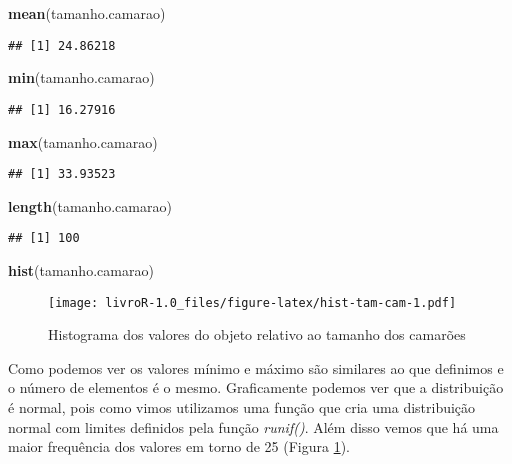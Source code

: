 \documentclass[]{book}
\newenvironment{Shaded}{\begin{snugshade}}{\end{snugshade}}
\newcommand{\KeywordTok}[1]{\textcolor[rgb]{0.13,0.29,0.53}{\textbf{#1}}}
\newcommand{\NormalTok}[1]{#1}
\begin{document}
\begin{Shaded}
\begin{Highlighting}[]
\KeywordTok{mean}\NormalTok{(tamanho.camarao)}
\end{Highlighting}
\end{Shaded}

\begin{verbatim}
## [1] 24.86218
\end{verbatim}

\begin{Shaded}
\begin{Highlighting}[]
\KeywordTok{min}\NormalTok{(tamanho.camarao)}
\end{Highlighting}
\end{Shaded}

\begin{verbatim}
## [1] 16.27916
\end{verbatim}

\begin{Shaded}
\begin{Highlighting}[]
\KeywordTok{max}\NormalTok{(tamanho.camarao)}
\end{Highlighting}
\end{Shaded}

\begin{verbatim}
## [1] 33.93523
\end{verbatim}

\begin{Shaded}
\begin{Highlighting}[]
\KeywordTok{length}\NormalTok{(tamanho.camarao)}
\end{Highlighting}
\end{Shaded}

\begin{verbatim}
## [1] 100
\end{verbatim}

\begin{Shaded}
\begin{Highlighting}[]
\KeywordTok{hist}\NormalTok{(tamanho.camarao)}
\end{Highlighting}
\end{Shaded}

\begin{figure}
\centering
\texttt{[image: livroR-1.0\_files/figure-latex/hist-tam-cam-1.pdf]}
\caption{\label{fig:hist-tam-cam}Histograma dos valores do objeto relativo ao tamanho dos camarões}
\end{figure}

Como podemos ver os valores mínimo e máximo são similares ao que definimos e o número de elementos é o mesmo. Graficamente podemos ver que a distribuição é normal, pois como vimos utilizamos uma função que cria uma distribuição normal com limites definidos pela função \emph{runif()}. Além disso vemos que há uma maior frequência dos valores em torno de 25 (Figura \ref{fig:hist-tam-cam}).
\end{document}
